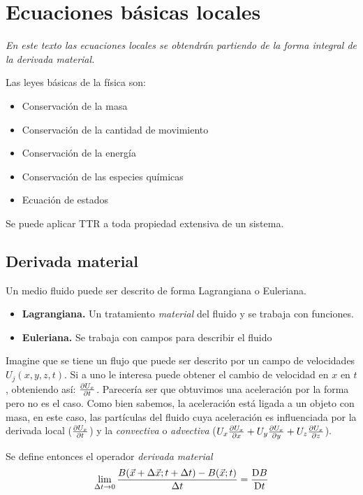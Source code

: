 
\section{Ecuaciones básicas locales}
\textit{En este texto las ecuaciones locales se obtendrán partiendo de la forma integral de la derivada material.}

Las leyes básicas de la física son:
\begin{itemize}
    \item Conservación de la masa
    \item Conservación de la cantidad de movimiento
    \item Conservación de la energía
    \item Conservación de las especies químicas
    \item Ecuación de estados 
\end{itemize}
Se puede aplicar TTR a toda propiedad extensiva de un sistema. 
\subsection{Derivada material}
Un medio fluido puede ser descrito de forma Lagrangiana o Euleriana.
\begin{itemize}
	\item \textbf{Lagrangiana.} Un tratamiento \textit{material} del fluido y se trabaja con funciones.
	\item \textbf{Euleriana.} Se trabaja con campos para describir el fluido
\end{itemize} 


Imagine que se tiene un flujo que puede ser descrito por un campo de velocidades $U_j(x,y,z,t)$. Si a uno le interesa puede obtener el cambio de velocidad en $x$ en $t$, obteniendo así: $\frac{\partial U_x}{\partial t}$. Parecería ser que obtuvimos una aceleración por la forma pero no es el caso. Como bien sabemos, la aceleración está ligada a un objeto con masa, en este caso, las partículas del fluido cuya aceleración es influenciada por la derivada local ($\frac{\partial U_x}{\partial t}$) y la \textit{convectiva} o \textit{advectiva} ($U_x\frac{\partial U_x}{\partial x}+U_y\frac{\partial U_x}{\partial y}+U_z\frac{\partial U_x}{\partial z}$).

Se define entonces el operador \textit{derivada material}
\begin{equation}
\lim_{\Delta t \rightarrow 0} \frac{B(\vec{x}+\Delta \vec{x};t+\Delta t) - B(\vec{x};t)}{\Delta t} = \frac{\textrm{D} B}{\textrm{D} t}
\end{equation}


